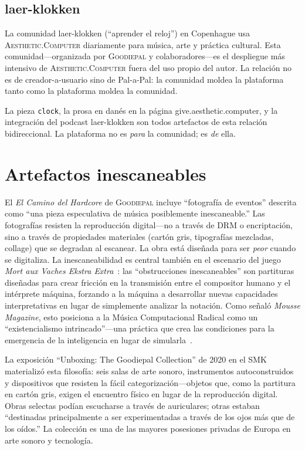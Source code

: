 \documentclass[10pt,letterpaper,twocolumn]{article}
\newcommand{\ac}{\textsc{Aesthetic.Computer}}
\newcommand{\gp}{\textsc{Goodiepal}}
\begin{document}
\subsection{laer-klokken}

La comunidad laer-klokken (``aprender el reloj'') en Copenhague usa \ac{} diariamente para música, arte y práctica cultural. Esta comunidad---organizada por \gp{} y colaboradores---es el despliegue más intensivo de \ac{} fuera del uso propio del autor. La relación no es de creador-a-usuario sino de Pal-a-Pal: la comunidad moldea la plataforma tanto como la plataforma moldea la comunidad.

La pieza \texttt{clock}, la prosa en danés en la página give.aesthetic.computer, y la integración del podcast laer-klokken son todos artefactos de esta relación bidireccional. La plataforma no es \emph{para} la comunidad; es \emph{de} ella.

\section{Artefactos inescaneables}

El \emph{El Camino del Hardcore} de \gp{} incluye ``fotografía de eventos'' descrita como ``una pieza especulativa de música posiblemente inescaneable.'' Las fotografías resisten la reproducción digital---no a través de DRM o encriptación, sino a través de propiedades materiales (cartón gris, tipografías mezcladas, collage) que se degradan al escanear. La obra está diseñada para ser \emph{peor} cuando se digitaliza. La inescaneabilidad es central también en el escenario del juego \emph{Mort aux Vaches Ekstra Extra}~\citep{goodiepal2007mortauxvaches}: las ``obstrucciones inescaneables'' son partituras diseñadas para crear fricción en la transmisión entre el compositor humano y el intérprete máquina, forzando a la máquina a desarrollar nuevas capacidades interpretativas en lugar de simplemente analizar la notación. Como señaló \emph{Mousse Magazine}, esto posiciona a la Música Computacional Radical como un ``existencialismo intrincado''---una práctica que crea las condiciones para la emergencia de la inteligencia en lugar de simularla~\citep{mousse2018goodiepal}.

La exposición ``Unboxing: The Goodiepal Collection'' de 2020 en el SMK~\citep{smk2020unboxing} materializó esta filosofía: seis salas de arte sonoro, instrumentos autoconstruidos y dispositivos que resisten la fácil categorización---objetos que, como la partitura en cartón gris, exigen el encuentro físico en lugar de la reproducción digital. Obras selectas podían escucharse a través de auriculares; otras estaban ``destinadas principalmente a ser experimentadas a través de los ojos más que de los oídos.'' La colección es una de las mayores posesiones privadas de Europa en arte sonoro y tecnología.
\end{document}
